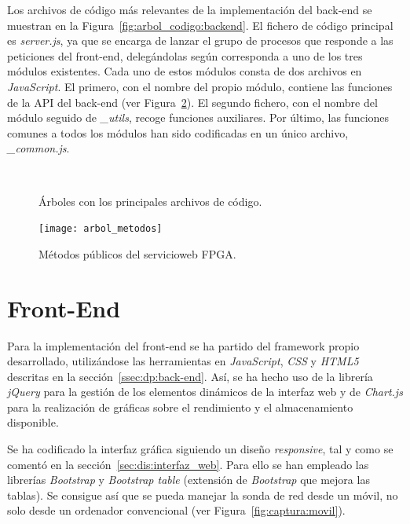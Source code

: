 Los archivos de código más relevantes de la implementación del \gls{back-end} se muestran en la Figura~\ref{fig:arbol_codigo:backend}.
El fichero de código principal es \textit{server.js}, ya que se encarga de lanzar el grupo de procesos que responde a las peticiones del \gls{front-end}, delegándolas según corresponda a uno de los tres módulos existentes.
Cada uno de estos módulos consta de dos archivos en \textit{JavaScript}.
El primero, con el nombre del propio módulo, contiene las funciones de la \gls{API} del \gls{back-end} (ver Figura~\ref{fig:arbol_metodos}).
El segundo fichero, con el nombre del módulo seguido de \textit{\_utils}, recoge funciones auxiliares.
Por último, las funciones comunes a todos los módulos han sido codificadas en un único archivo, \textit{\_common.js}.

\begin{figure}[!htp]
  \begin{center}
    \qquad
    \hspace{1.5cm}
    \\
    \caption{Árboles con los principales archivos de código.}
    \label{fig:arbol_codigo}
  \end{center}
\end{figure}

\begin{figure}[!htp]
  \centering
  \texttt{[image: arbol\_metodos]}
  \caption{Métodos públicos del \gls{servicioweb} \gls{FPGA}.}
  \label{fig:arbol_metodos}
\end{figure}

\section{Front-End\label{sec:imp:front_end}}

Para la implementación del \gls{front-end} se ha partido del \gls{framework} propio desarrollado, utilizándose las herramientas en \textit{JavaScript}, \textit{CSS} y \textit{HTML5} descritas en la sección~\ref{ssec:dp:back-end}.
Así, se ha hecho uso de la librería \textit{jQuery} para la gestión de los elementos dinámicos de la interfaz web y de \textit{Chart.js} para la realización de gráficas sobre el rendimiento y el almacenamiento disponible.

Se ha codificado la interfaz gráfica siguiendo un diseño \textit{responsive}, tal y como se comentó en la sección~\ref{sec:dis:interfaz_web}.
Para ello se han empleado las librerías \textit{Bootstrap} y \textit{Bootstrap table} (extensión de \textit{Bootstrap} que mejora las tablas).
Se consigue así que se pueda manejar la sonda de red desde un móvil, no solo desde un ordenador convencional (ver Figura~\ref{fig:captura:movil}).

